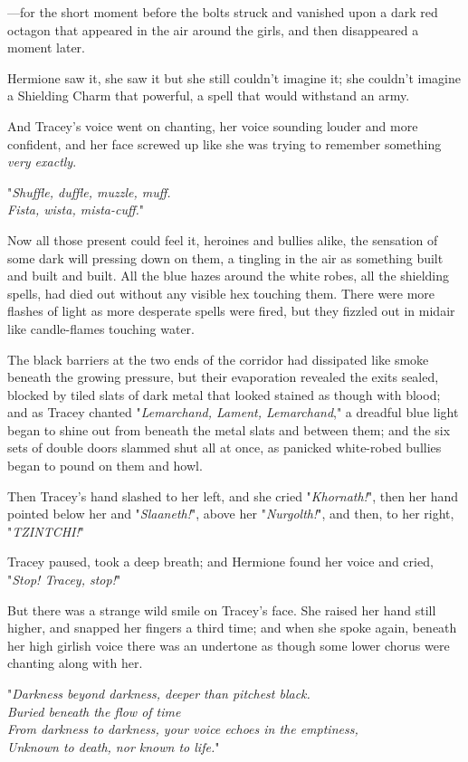 ---for the short moment before the bolts struck and vanished upon a dark red
octagon that appeared in the air around the girls, and then disappeared a
moment later.

Hermione saw it, she saw it but she still couldn't imagine it; she couldn't
imagine a Shielding Charm that powerful, a spell that would withstand an army.

And Tracey's voice went on chanting, her voice sounding louder and more
confident, and her face screwed up like she was trying to remember something
\emph{very exactly}.

"\emph{Shuffle, duffle, muzzle, muff.\\
Fista, wista, mista-cuff.}"

Now all those present could feel it, heroines and bullies alike, the sensation
of some dark will pressing down on them, a tingling in the air as something
built and built and built. All the blue hazes around the white robes, all the
shielding spells, had died out without any visible hex touching them. There
were more flashes of light as more desperate spells were fired, but they
fizzled out in midair like candle-flames touching water.

The black barriers at the two ends of the corridor had dissipated like smoke
beneath the growing pressure, but their evaporation revealed the exits sealed,
blocked by tiled slats of dark metal that looked stained as though with blood;
and as Tracey chanted "\emph{Lemarchand, Lament, Lemarchand}," a dreadful blue
light began to shine out from beneath the metal slats and between them; and the
six sets of double doors slammed shut all at once, as panicked white-robed
bullies began to pound on them and howl.

Then Tracey's hand slashed to her left, and she cried "\emph{Khornath!}", then
her hand pointed below her and "\emph{Slaaneth!}", above her
"\emph{Nurgolth!}", and then, to her right, "\emph{TZINTCHI!}"

Tracey paused, took a deep breath; and Hermione found her voice and cried,
"\emph{Stop! Tracey, stop!}"

But there was a strange wild smile on Tracey's face. She raised her hand still
higher, and snapped her fingers a third time; and when she spoke again, beneath
her high girlish voice there was an undertone as though some lower chorus were
chanting along with her.

"\emph{Darkness beyond darkness, deeper than pitchest black.\\
Buried beneath the flow of time{\el}\\
From darkness to darkness, your voice echoes in the emptiness,\\
Unknown to death, nor known to life.}"

